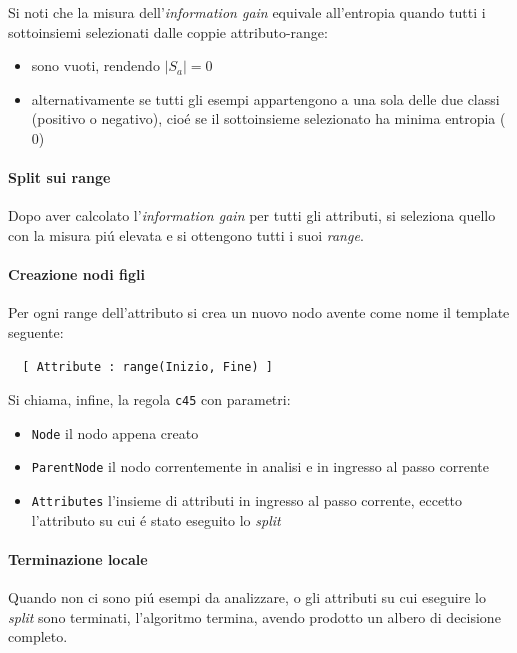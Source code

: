 \documentclass[preprint]{acm_proc_article-sp}
\begin{document}
Si noti che la misura dell'\textit{information gain} equivale all'entropia quando tutti i sottoinsiemi selezionati dalle coppie attributo-range:
\begin{itemize}
\item sono vuoti, rendendo $|S_a|=0$
\item alternativamente se tutti gli esempi appartengono a una sola delle due classi (positivo o negativo), cio\'e se il sottoinsieme selezionato ha minima entropia ($0$)
\end{itemize}

\paragraph{Split sui range}
Dopo aver calcolato l'\textit{information gain} per tutti gli attributi, si seleziona quello con la misura pi\'u elevata e si ottengono tutti i suoi \textit{range}.

\paragraph{Creazione nodi figli}
Per ogni range dell'attributo si crea un nuovo nodo avente come nome il template seguente:
\begin{verbatim}
  [ Attribute : range(Inizio, Fine) ]
\end{verbatim}
Si chiama, infine, la regola \verb|c45| con parametri:
\begin{itemize}
\item \verb|Node| il nodo appena creato
\item \verb|ParentNode| il nodo correntemente in analisi e in ingresso al passo corrente
\item \verb|Attributes| l'insieme di attributi in ingresso al passo corrente, eccetto l'attributo su cui \'e stato eseguito lo \textit{split}
\end{itemize}

\paragraph{Terminazione locale}
Quando non ci sono pi\'u esempi da analizzare, o gli attributi su cui eseguire lo \textit{split} sono terminati, l'algoritmo termina, avendo prodotto un albero di decisione completo.
\end{document}
